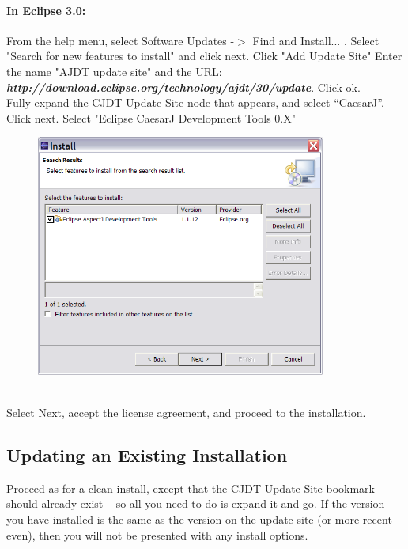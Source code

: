 \paragraph{In Eclipse 3.0:}
\label{sec:In Eclipse 3.0}
 From the help menu, select Software Updates -$>$ Find and Install... . Select "Search for new features to install" and click next.
Click "Add Update Site" Enter the name
"AJDT update site" \newline and the URL:  \textbf{\textit{http://download.eclipse.org/technology/ajdt/30/update}}. Click ok.\\
Fully expand the CJDT Update Site node that appears, and select "`CaesarJ"'. Click
next. Select "Eclipse CaesarJ Development Tools 0.X"\\
\begin{figure}[htbp]
	\centering
		\includegraphics[width=0.85\textwidth]{./images/install_page_3_0.png}
	\label{fig:install_page_3_0}
\end{figure}\\
Select Next, accept the license agreement, and proceed to the
installation.

\subsection{Updating an Existing Installation}
Proceed as for a clean install, except that the CJDT Update Site bookmark should already
exist -- so all you need to do is expand it and go. If the version you have
installed is the same as the version on the update site (or more recent even),
then you will not be presented with any install options.
\newpage
